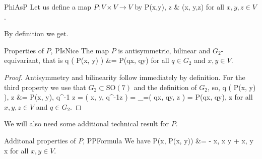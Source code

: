 \begin{definitions}{\cite[Definition 3.10.8; page 175]{hamilton}}{PhiAsP}
Let us define a map $P: V \times V \to V$ by
\ba
\langle
P(x,y), z
\rangle
&\coloneqq
\phi(x, y,z)
\ea
for all $x,y,z \in V$.
\end{definitions}

By definition we get.

\begin{propositions}{Properties of $P$, \cite[Proposition 3.10.9]{hamilton}}{PIsNice}
The map $P$ is antisymmetric, bilinear and $G_2$-equivariant, that is
\ba
q \bigl( P(x, y) \bigr)
&=
P(qx, qy)
\ea
for all $q \in G_2$ and $x, y \in V$.
\end{propositions}

\begin{proof}
\leavevmode\newline
Antisymmetry and bilinearity follow immediately by definition. For the third property we use that $G_2 \subset \mathrm{SO}(7)$ and the definition of $G_2$, so,
\bas
\langle q \bigl( P(x, y) \bigr), z \rangle
&=
\mleft\langle P(x, y), q^{-1} z \mright\rangle
=
\phi\mleft(
	x, y, q^{-1}z
\mright)
=
_{=\phi}\mleft(
	qx, qy, z
\mright)
=
\langle P(qx, qy), z \rangle
\eas
for all $x, y, z \in V$ and $q \in G_2$.
\end{proof}

We will also need some additional technical result for $P$.

\begin{lemmata}{Additonal properties of $P$, \newline \cite[first part of Exercise 3.12.16; page 190]{hamilton}}{PPFormula}
We have
\ba
P\bigl(x, P(x, y)\bigr)
&=
- \langle x, x \rangle y
	+ \langle x, y \rangle x
\ea
for all $x, y \in V$.
\end{lemmata}


